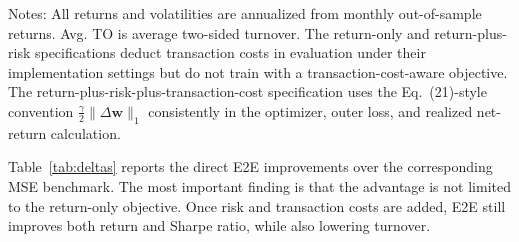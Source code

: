 \documentclass[11pt]{article}
\begin{document}
\begin{table}[t]
\centering
\caption{Out-of-sample performance: E2E versus MSE benchmarks}
\label{tab:main_results}
\begin{flushleft}
\small
Notes: All returns and volatilities are annualized from monthly out-of-sample returns. Avg. TO is average two-sided turnover. The return-only and return-plus-risk specifications deduct transaction costs in evaluation under their implementation settings but do not train with a transaction-cost-aware objective. The return-plus-risk-plus-transaction-cost specification uses the Eq.~(21)-style convention $\frac{\gamma}{2}\|\Delta \bm w\|_1$ consistently in the optimizer, outer loss, and realized net-return calculation.
\end{flushleft}
\end{table}

Table~\ref{tab:deltas} reports the direct E2E improvements over the corresponding MSE benchmark. The most important finding is that the advantage is not limited to the return-only objective. Once risk and transaction costs are added, E2E still improves both return and Sharpe ratio, while also lowering turnover.
\end{document}
